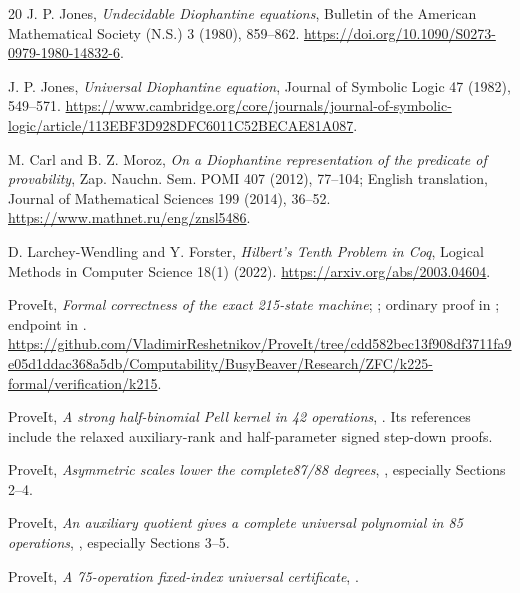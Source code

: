 \documentclass[11pt]{article}
\theoremstyle{definition}
\begin{document}
\begin{thebibliography}{20}
J. P. Jones, \emph{Undecidable Diophantine equations}, Bulletin of the
American Mathematical Society (N.S.) 3 (1980), 859--862.
\url{https://doi.org/10.1090/S0273-0979-1980-14832-6}.

J. P. Jones, \emph{Universal Diophantine equation}, Journal of Symbolic
Logic 47 (1982), 549--571.
\url{https://www.cambridge.org/core/journals/journal-of-symbolic-logic/article/113EBF3D928DFC6011C52BECAE81A087}.

M. Carl and B. Z. Moroz, \emph{On a Diophantine representation of the
predicate of provability}, Zap. Nauchn. Sem. POMI 407 (2012), 77--104;
English translation, Journal of Mathematical Sciences 199 (2014), 36--52.
\url{https://www.mathnet.ru/eng/znsl5486}.

D. Larchey-Wendling and Y. Forster, \emph{Hilbert's Tenth Problem in Coq},
Logical Methods in Computer Science 18(1) (2022).
\url{https://arxiv.org/abs/2003.04604}.

ProveIt, \emph{Formal correctness of the exact 215-state machine};
;
ordinary proof in ; endpoint in
.
\url{https://github.com/VladimirReshetnikov/ProveIt/tree/cdd582bec13f908df3711fa9e05d1ddac368a5db/Computability/BusyBeaver/Research/ZFC/k225-formal/verification/k215}.

ProveIt, \emph{A strong half-binomial Pell kernel in 42 operations},
.
Its references include the relaxed auxiliary-rank and half-parameter
signed step-down proofs.

ProveIt, \emph{Asymmetric scales lower the complete87/88 degrees},
,
especially Sections 2--4.

ProveIt, \emph{An auxiliary quotient gives a complete universal polynomial
in 85 operations},
,
especially Sections 3--5.

ProveIt, \emph{A 75-operation fixed-index universal certificate},
.


\end{thebibliography}
\end{document}
